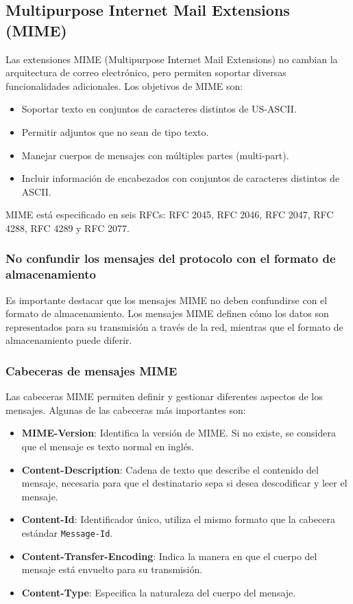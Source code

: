 \documentclass[a4paper,12pt]{article}
\begin{document}
\subsection{Multipurpose Internet Mail Extensions (MIME)}

Las extensiones MIME (Multipurpose Internet Mail Extensions) no cambian la arquitectura de correo electrónico, pero permiten soportar diversas funcionalidades adicionales. Los objetivos de MIME son:

\begin{itemize}
    \item Soportar texto en conjuntos de caracteres distintos de US-ASCII.
    \item Permitir adjuntos que no sean de tipo texto.
    \item Manejar cuerpos de mensajes con múltiples partes (multi-part).
    \item Incluir información de encabezados con conjuntos de caracteres distintos de ASCII.
\end{itemize}

MIME está especificado en seis RFCs: RFC 2045, RFC 2046, RFC 2047, RFC 4288, RFC 4289 y RFC 2077.

\subsubsection{No confundir los mensajes del protocolo con el formato de almacenamiento}
Es importante destacar que los mensajes MIME no deben confundirse con el formato de almacenamiento. Los mensajes MIME definen cómo los datos son representados para su transmisión a través de la red, mientras que el formato de almacenamiento puede diferir.

\subsubsection{Cabeceras de mensajes MIME}
Las cabeceras MIME permiten definir y gestionar diferentes aspectos de los mensajes. Algunas de las cabeceras más importantes son:

\begin{itemize}
    \item \textbf{MIME-Version}: Identifica la versión de MIME. Si no existe, se considera que el mensaje es texto normal en inglés.
    \item \textbf{Content-Description}: Cadena de texto que describe el contenido del mensaje, necesaria para que el destinatario sepa si desea descodificar y leer el mensaje.
    \item \textbf{Content-Id}: Identificador único, utiliza el mismo formato que la cabecera estándar \texttt{Message-Id}.
    \item \textbf{Content-Transfer-Encoding}: Indica la manera en que el cuerpo del mensaje está envuelto para su transmisión.
    \item \textbf{Content-Type}: Especifica la naturaleza del cuerpo del mensaje.
\end{itemize}
\end{document}
